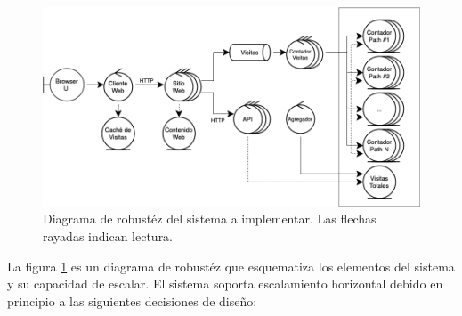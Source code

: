 \documentclass[11pt]{scrartcl}
\begin{document}
\begin{figure}
\centering
\includegraphics[scale=0.45]{img/robustness}
\caption{Diagrama de robustéz del sistema a implementar. Las flechas rayadas indican lectura.}
\label{fig:robustness}
\end{figure}

La figura \ref{fig:robustness} es un diagrama de robustéz que esquematiza los elementos del sistema y su capacidad de escalar. El sistema soporta escalamiento horizontal debido en principio a las siguientes decisiones de diseño:
\end{document}
